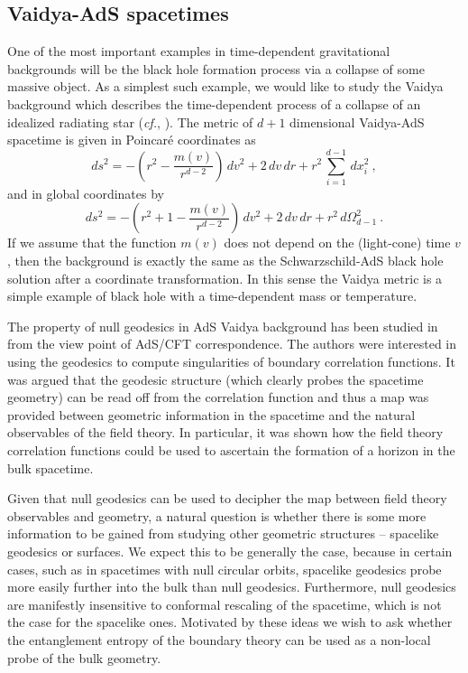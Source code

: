 \documentclass[12pt]{article}
\newcommand{\be}{\begin{equation}}
\newcommand{\ee}{\end{equation}}
\def\cf{{\it cf.}}
\def\f#1#2{{\frac{#1}{#2}}}
\def\f#1#2{{\frac{#1}{#2}}}
\def\f {\frac}
\begin{document}
\subsection{Vaidya-AdS spacetimes}
\label{adsvaidya}
One of the most important examples in time-dependent gravitational
backgrounds will be the black hole formation process via a collapse
of some massive object. As a simplest such example, we would like
to study the Vaidya background which describes the time-dependent
process of a collapse of an idealized radiating star (\cf, \cite{Stephani:2003tm}).
The metric of $d+1$ dimensional Vaidya-AdS spacetime is given in Poincar\'e coordinates as
%
\be
ds^2=-\left(r^2-\f{m(v)}{r^{d-2}}\right)\, dv^2+2\, dv\,
dr+r^2\, \sum_{i=1}^{d-1}\, dx_i^2\ , \ee
%
and in global coordinates by
%
\be
ds^2=-\left(r^2+1-\f{m(v)}{r^{d-2}}\right)\, dv^2+2\, dv \, dr+r^2\,
d\Omega_{d-1}^2 \ . \ee
%
If we assume that the function $m(v)$ does not depend on the
(light-cone) time $v$, then the background is exactly the same as
the Schwarzschild-AdS black hole solution after a coordinate
transformation. In this sense the Vaidya metric is a simple example
of black hole with a time-dependent mass or temperature.

The property of null geodesics in AdS Vaidya background has been studied
in \cite{Hubeny:2006yu} from the view point of AdS/CFT
correspondence. The authors were interested in using the geodesics to compute singularities of boundary correlation functions. It was argued that the geodesic structure (which clearly probes the spacetime geometry)  can be read off from the correlation function and thus a map was provided between geometric information in the spacetime and the natural observables of the field theory. In particular, it was shown how the field theory correlation functions could be used to ascertain the formation of a horizon in the bulk spacetime.

Given that null geodesics can be used to decipher the map between field theory observables and geometry, a natural question is whether there is some more information to be gained from studying other geometric structures -- spacelike geodesics or surfaces.  We expect this to be generally the case, because in certain cases, such as in spacetimes with null circular orbits, spacelike geodesics probe more easily further into the bulk than null geodesics.  Furthermore, null geodesics are manifestly insensitive to conformal rescaling of the spacetime, which is not the case for the spacelike ones.
Motivated by these ideas we wish to ask whether the entanglement entropy of the boundary theory can be used as a non-local probe of the bulk geometry.
\end{document}
